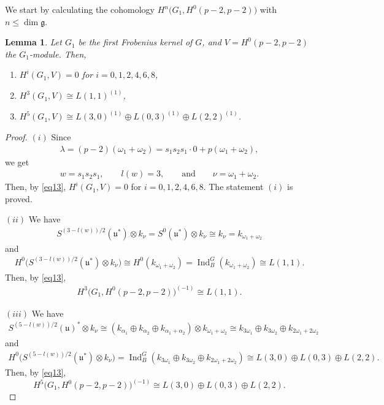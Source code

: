 \documentclass[pdftex]{sigma}%
\numberwithin{equation}{section}
\newtheorem{Lemma}[Theorem]{Lemma}
\begin{document}
We start by calculating the cohomology $H^n\big(G_1,H^0(p-2,p-2)\big)$ with $n\leq \dim \mathfrak{g}$.

{\samepage\begin{Lemma}\label{l6}
Let $G_1$ be the first Frobenius kernel of $G$, and $V=H^0(p-2,p-2)$ the $G_1$-module. Then,
\begin{enumerate}\itemsep=0pt

\item[$(i)$] $H^{i}(G_1,V)=0$ for $i=0,1,2,4,6,8$,

\item[$(ii)$] $H^{3}(G_1,V)\cong L(1,1)^{(1)}$,

\item[$(iii)$] $H^5(G_1,V)\cong L(3,0)^{(1)}\oplus L(0,3)^{(1)}\oplus L(2,2)^{(1)}$.
\end{enumerate}
\end{Lemma}

}

\begin{proof}
$(i)$ Since
\begin{gather*}
\lambda=(p-2)(\omega_1+\omega_2)=s_1s_2s_1\cdot 0+p(\omega_1+\omega_2),
\end{gather*}
we get
\begin{gather*}
w=s_1s_2s_1,\qquad l(w)=3,\qquad\text{and}\qquad\nu=\omega_1+\omega_2.
\end{gather*}
Then, by \eqref{eq13},
$H^{i}(G_1,V)=0$ for $i=0,1,2,4,6,8$. The statement $(i)$ is proved.

$(ii)$ We have
\begin{gather*}
S^{(3-l(w))/2}(\mathfrak{u}^*)\otimes k_{\nu}=S^0(\mathfrak{u}^*)\otimes k_{\nu}\cong k_{\nu}=k_{\omega_1+\omega_2}
\end{gather*}
and
\begin{gather*}
H^0\big(S^{(3-l(w))/2}(\mathfrak{u}^*)\otimes k_{\nu}\big)\cong H^0(k_{\omega_1+\omega_2})=\operatorname{Ind}_B^{G}(k_{\omega_1+\omega_2})\cong L(1,1).
\end{gather*}
Then, by \eqref{eq13},
\begin{gather*}
H^3\big(G_1,H^0(p-2,p-2)\big)^{(-1)}\cong L(1,1).
\end{gather*}

$(iii)$ We have
\begin{gather*}
S^{(5-l(w))/2}(\mathfrak{u})^*\otimes k_{\nu}\cong (k_{\alpha_1}\oplus
k_{\alpha_2}\oplus k_{\alpha_1+\alpha_2})\otimes k_{\omega_1+\omega_2}\cong
k_{3\omega_1}\oplus k_{3\omega_2}\oplus k_{2\omega_1+2\omega_2}
\end{gather*}
and
\begin{gather*}
H^0\big(S^{(5-l(w))/2}(\mathfrak{u}^*)\otimes k_{\nu}\big)=\operatorname{Ind}_B^{G}(k_{3\omega_1}\oplus k_{3\omega_2}\oplus k_{2\omega_1+2\omega_2})
 \cong L(3,0)\oplus L(0,3)\oplus L(2,2).
 \end{gather*}
Then, by \eqref{eq13},
\begin{equation*}
H^5\big(G_1,H^0(p-2,p-2)\big)^{(-1)}\cong L(3,0)\oplus L(0,3)\oplus L(2,2).
\end{equation*}
\renewcommand{\qed}{}
\end{proof}
\end{document}
